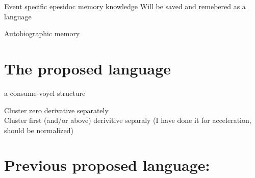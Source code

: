 \begin{frame}{Event specific epesidoc memory knowledge}
    Will be saved and remebered as a language
    
    Autobiographic memory
    
    \section{The proposed language}
        a consume-voyel structure
        
        Cluster zero derivative separately\\
        
        Cluster first (and/or above) derivitive separaly
        (I have done it for acceleration, should be normalized)
    
    
    \section{Previous proposed language:}

\end{frame}